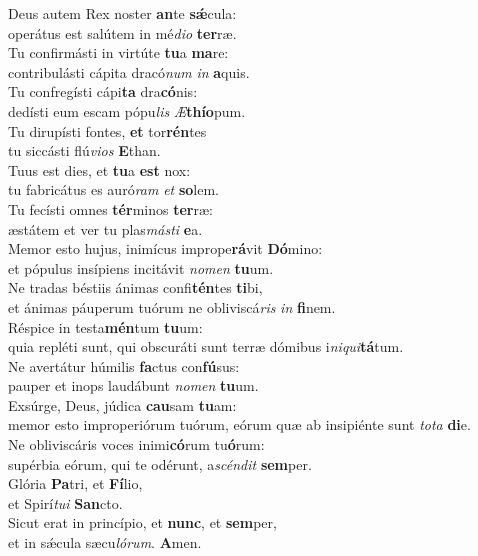 \oddverse Deus autem Rex noster \textbf{an}te \textbf{sǽ}cula:~\*\\
\oddverse operátus est salútem in mé\textit{di}\textit{o} \textbf{ter}ræ.\\
\evenverse Tu confirmásti in virtúte \textbf{tu}a \textbf{ma}re:~\*\\
\evenverse contribulásti cápita dracó\textit{num} \textit{in} \textbf{a}quis.\\
\oddverse Tu confregísti cápi\textbf{ta} dra\textbf{có}nis:~\*\\
\oddverse dedísti eum escam pópu\textit{lis} \textit{Æ}\textbf{thí}\textbf{o}pum.\\
\evenverse Tu dirupísti fontes, \textbf{et} tor\textbf{rén}tes~\*\\
\evenverse tu siccásti flú\textit{vi}\textit{os} \textbf{E}than.\\
\oddverse Tuus est dies, et \textbf{tu}a \textbf{est} nox:~\*\\
\oddverse tu fabricátus es auró\textit{ram} \textit{et} \textbf{so}lem.\\
\evenverse Tu fecísti omnes \textbf{tér}minos \textbf{ter}ræ:~\*\\
\evenverse æstátem et ver tu plas\textit{má}\textit{sti} \textbf{e}a.\\
\oddverse Memor esto hujus, inimícus imprope\textbf{rá}vit \textbf{Dó}mino:~\*\\
\oddverse et pópulus insípiens incitávit \textit{no}\textit{men} \textbf{tu}um.\\
\evenverse Ne tradas béstiis ánimas confi\textbf{tén}tes \textbf{ti}bi,~\*\\
\evenverse et ánimas páuperum tuórum ne obliviscá\textit{ris} \textit{in} \textbf{fi}nem.\\
\oddverse Réspice in testa\textbf{mén}tum \textbf{tu}um:~\*\\
\oddverse quia repléti sunt, qui obscuráti sunt terræ dómibus i\textit{ni}\textit{qui}\textbf{tá}tum.\\
\evenverse Ne avertátur húmilis \textbf{fa}ctus con\textbf{fú}sus:~\*\\
\evenverse pauper et inops laudábunt \textit{no}\textit{men} \textbf{tu}um.\\
\oddverse Exsúrge, Deus, júdica \textbf{cau}sam \textbf{tu}am:~\*\\
\oddverse memor esto improperiórum tuórum, eórum quæ ab insipiénte sunt \textit{to}\textit{ta} \textbf{di}e.\\
\evenverse Ne obliviscáris voces inimi\textbf{có}rum tu\textbf{ó}rum:~\*\\
\evenverse supérbia eórum, qui te odérunt, a\textit{scén}\textit{dit} \textbf{sem}per.\\
\oddverse Glória \textbf{Pa}tri, et \textbf{Fí}lio,~\*\\
\oddverse et Spirí\textit{tu}\textit{i} \textbf{San}cto.\\
\evenverse Sicut erat in princípio, et \textbf{nunc}, et \textbf{sem}per,~\*\\
\evenverse et in sǽcula sæcu\textit{ló}\textit{rum}. \textbf{A}men.\\
